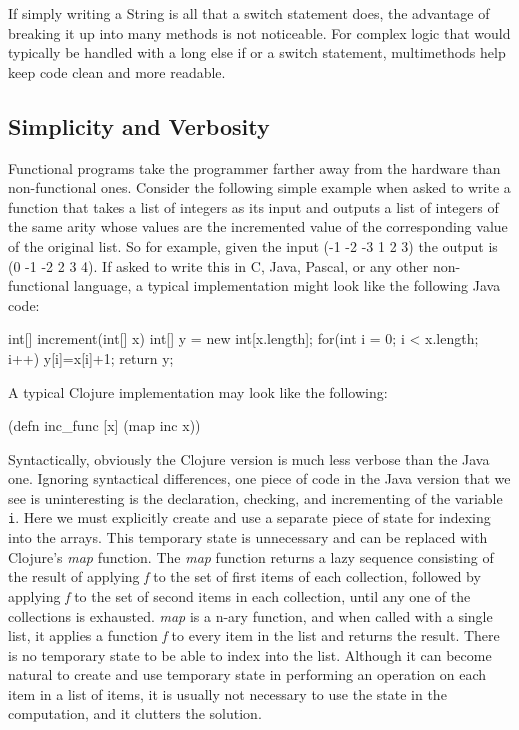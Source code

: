 If simply writing a String is all that a switch statement does, the advantage of breaking it up into many
methods is not noticeable. For complex logic that would typically be handled with a long else if or a switch statement, 
multimethods help keep code clean and more readable.

\subsection{Simplicity and Verbosity}
Functional programs take the programmer farther away from the hardware than non-functional ones. Consider the following simple example when asked to write a function that takes a list of integers as its input and outputs a list of integers of the same arity whose values are the incremented value of the corresponding value of the original list. So for example, given the input (-1 -2 -3 1 2 3) the output is (0 -1 -2 2 3 4). If asked to write this in C, Java, Pascal, or any other non-functional language, a typical implementation might look like the following Java code: 

int[] increment(int[] x) {
	int[] y = new int[x.length];
	for(int i = 0; i < x.length; i++) { 
	  y[i]=x[i]+1;
         }
         return y;
}

A typical Clojure implementation may look like the following: 

(defn inc_func [x] (map inc x))

Syntactically, obviously the Clojure version is much less verbose than the Java one.
Ignoring syntactical differences, one piece of code in the Java version that we see is uninteresting is the declaration,
checking, and incrementing of the variable {\tt i}. 
Here we must explicitly create and use a separate piece of state for indexing into the arrays. 
This temporary state is unnecessary and can be replaced with Clojure's
{\it map} function. The {\it map} function returns a lazy sequence
consisting of the result of applying {\it f} to the
set of first items of each collection, followed by applying {\it f} to the set
of second items in each collection, until any one of the collections is
exhausted. {\it map} is a n-ary function, and when called with a
single list, it applies a function {\it f} to every item in the list
and returns the result. 
There is no temporary state to be able to index into the list. 
Although it can become natural to create and use temporary state in performing an operation on each item in a list of items,
it is usually not necessary to use the state in the computation, and it clutters the solution. 


